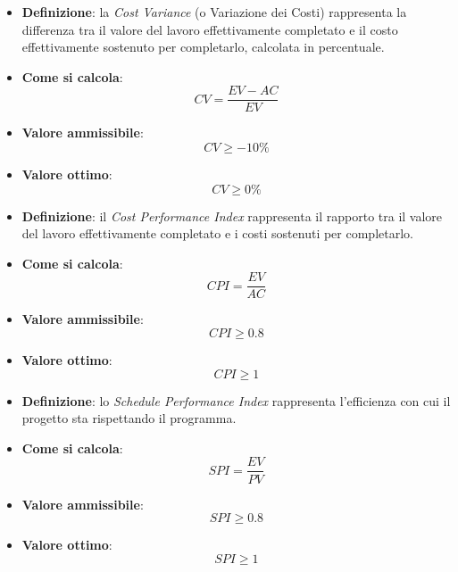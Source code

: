 \begin{itemize}
	\item \textbf{Definizione}: la \textit{Cost Variance} (o Variazione dei Costi) rappresenta la differenza tra il valore del lavoro effettivamente completato e il costo effettivamente sostenuto per completarlo, calcolata in percentuale.
	\item \textbf{Come si calcola}: \begin{equation*}CV = \frac{EV - AC}{EV}\end{equation*}
	\item \textbf{Valore ammissibile}: \begin{equation*}CV \geq -10\%\end{equation*}
	\item \textbf{Valore ottimo}: \begin{equation*}CV \geq 0\%\end{equation*}
\end{itemize}

\begin{itemize}
	\item \textbf{Definizione}: il \textit{Cost Performance Index} rappresenta il rapporto tra il valore del lavoro effettivamente completato e i costi sostenuti per completarlo.
	\item \textbf{Come si calcola}: \begin{equation*}CPI = \frac{EV}{AC}\end{equation*}
	\item \textbf{Valore ammissibile}: \begin{equation*}CPI \geq 0.8\end{equation*}
	\item \textbf{Valore ottimo}: \begin{equation*}CPI \geq 1\end{equation*}
\end{itemize}

\begin{itemize}
	\item \textbf{Definizione}: lo \textit{Schedule Performance Index} rappresenta l'efficienza con cui il progetto sta rispettando il programma.
	\item \textbf{Come si calcola}: \begin{equation*}SPI = \frac{EV}{PV}\end{equation*}
	\item \textbf{Valore ammissibile}: \begin{equation*}SPI \geq 0.8\end{equation*}
	\item \textbf{Valore ottimo}: \begin{equation*}SPI \geq 1\end{equation*}
\end{itemize}

